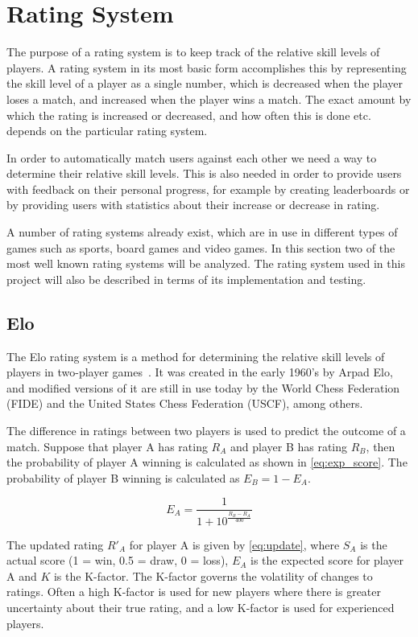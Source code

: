 \section{Rating System}
The purpose of a rating system is to keep track of the relative skill levels of players.
A rating system in its most basic form accomplishes this by representing the skill level of a player as a single number, which is decreased when the player loses a match, and increased when the player wins a match.
The exact amount by which the rating is increased or decreased, and how often this is done etc. depends on the particular rating system.

In order to automatically match users against each other we need a way to determine their relative skill levels.
This is also needed in order to provide users with feedback on their personal progress, for example by creating leaderboards or by providing users with statistics about their increase or decrease in rating.

A number of rating systems already exist, which are in use in different types of games such as sports, board games and video games.
In this section two of the most well known rating systems will be analyzed.
The rating system used in this project will also be described in terms of its implementation and testing.

\subsection{Elo}
\label{sec:elo}
The Elo rating system is a method for determining the relative skill levels of players in two-player games~\citep{elo}.
It was created in the early 1960's by Arpad Elo, and modified versions of it are still in use today by the World Chess Federation (FIDE) and the United States Chess Federation (USCF), among others.

The difference in ratings between two players is used to predict the outcome of a match.
Suppose that player A has rating $R_A$ and player B has rating $R_B$, then the probability of player A winning is calculated as shown in \autoref{eq:exp_score}.
The probability of player B winning is calculated as $E_B = 1 - E_A$.

\begin{equation} \label{eq:exp_score}
E_A = \frac{1}{1 + 10^\frac{R_B - R_A}{400}}
\end{equation}

The updated rating $R'_A$ for player A is given by \autoref{eq:update}, where $S_A$ is the actual score (1 = win, 0.5 = draw, 0 = loss), $E_A$ is the expected score for player A and $K$ is the K-factor.
The K-factor governs the volatility of changes to ratings.
Often a high K-factor is used for new players where there is greater uncertainty about their true rating, and a low K-factor is used for experienced players.

